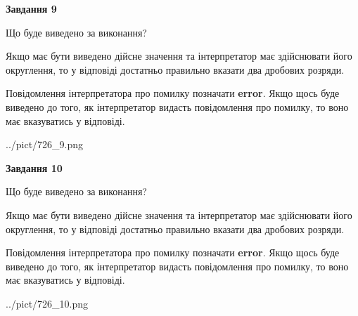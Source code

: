 \documentclass[12pt, ukrainian]{article}
\begin{document}
{\begin {Large}
{\begin {center}\textbf{Завдання 9}\end {center}}\par
Що буде виведено за виконання? \par

Якщо має бути виведено дійсне значення та інтерпретатор має здійснювати його округлення, 
то у відповіді достатньо правильно вказати два дробових розряди.

Повідомлення інтерпретатора про помилку позначати \textbf{error}.
Якщо щось буде виведено до того, як інтерпретатор видасть повідомлення про помилку, 
то воно має вказуватись у відповіді. \par

\begin{center}
	{../pict/726_9.png}
\end{center}
\newpage

{\begin {center}\textbf{Завдання 10}\end {center}}\par
Що буде виведено за виконання? \par

Якщо має бути виведено дійсне значення та інтерпретатор має здійснювати його округлення, 
то у відповіді достатньо правильно вказати два дробових розряди.

Повідомлення інтерпретатора про помилку позначати \textbf{error}.
Якщо щось буде виведено до того, як інтерпретатор видасть повідомлення про помилку, 
то воно має вказуватись у відповіді. \par

\begin{center}
	{../pict/726_10.png}
\end{center}
\newpage

\end {Large}}
\end{document}
